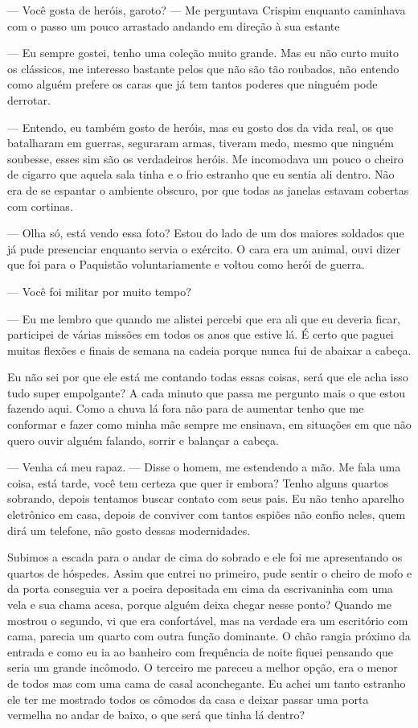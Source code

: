 — Você gosta de heróis, garoto? — Me perguntava Crispim enquanto caminhava com o passo um pouco arrastado andando em direção à sua estante

— Eu sempre gostei, tenho uma coleção muito grande. Mas eu não curto muito os clássicos, me interesso bastante pelos que não são tão roubados, não entendo como alguém prefere os caras que já tem tantos poderes que ninguém pode derrotar.

— Entendo, eu também gosto de heróis, mas eu gosto dos da vida real, os que batalharam em guerras, seguraram armas, tiveram medo, mesmo que ninguém soubesse, esses sim são os verdadeiros heróis.
Me incomodava um pouco o cheiro de cigarro que aquela sala tinha e o frio estranho que eu sentia ali dentro. Não era de se espantar o ambiente obscuro, por que todas as janelas estavam cobertas com cortinas.

— Olha só, está vendo essa foto? Estou do lado de um dos maiores soldados que já pude presenciar enquanto servia o exército. O cara era um animal, ouvi dizer que foi para o Paquistão voluntariamente e voltou como herói de guerra.

— Você foi militar por muito tempo?

— Eu me lembro que quando me alistei percebi que era ali que eu deveria ficar, participei de várias missões em todos os anos que estive lá. É certo que paguei muitas flexões e finais de semana na cadeia porque nunca fui de abaixar a cabeça.

Eu não sei por que ele está me contando todas essas coisas, será que ele acha isso tudo super empolgante? A cada minuto que passa me pergunto mais o que estou fazendo aqui. Como a chuva lá fora não para de aumentar tenho que me conformar e fazer como minha mãe sempre me ensinava, em situações em que não quero ouvir alguém falando, sorrir e balançar a cabeça.

— Venha cá meu rapaz. — Disse o homem, me estendendo a mão. Me fala uma coisa, está tarde, você tem certeza que quer ir embora? Tenho alguns quartos sobrando, depois tentamos buscar contato com seus pais. Eu não tenho aparelho eletrônico em casa, depois de conviver com tantos espiões não confio neles, quem dirá um telefone, não gosto dessas modernidades.

Subimos a escada para o andar de cima do sobrado e ele foi me apresentando os quartos de hóspedes. Assim que entrei no primeiro, pude sentir o cheiro de mofo e da porta conseguia ver a poeira depositada em cima da escrivaninha com uma vela e sua chama acesa, porque alguém deixa chegar nesse ponto? Quando me mostrou o segundo, vi que era confortável, mas na verdade era um escritório com cama, parecia um quarto com outra função dominante. O chão rangia próximo da entrada e como eu ia ao banheiro com frequência de noite fiquei pensando que seria um grande incômodo. O terceiro me pareceu a melhor opção, era o menor de todos mas com uma cama de casal aconchegante. Eu achei um tanto estranho ele ter me mostrado todos os cômodos da casa e deixar passar uma porta vermelha no andar de baixo, o que será que tinha lá dentro?

